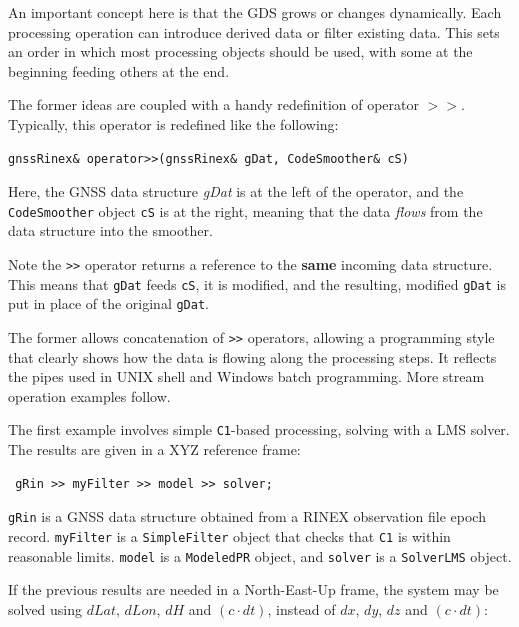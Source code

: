 \documentclass[letterpaper,ugly,10pt]{ion-gps}
\newcommand{\gpstkcommand}[1]{\texttt{\mbox{#1}}}
\newcommand{\gpstkclass}[1]{\texttt{\mbox{#1}}}
\newcommand{\rinexobservable}[1]{\texttt{#1}}
\begin{document}
An important concept here is that the GDS grows or changes dynamically. Each processing operation can introduce derived data or filter existing data. This sets an order in which most processing objects should be used, with some at the beginning feeding others at the end.

The former ideas are coupled with a handy redefinition of operator $>>$. Typically, this operator is redefined like the following:

\begin{scriptsize}
\begin{lstlisting}
gnssRinex& operator>>(gnssRinex& gDat, CodeSmoother& cS)
\end{lstlisting}
\end{scriptsize}

Here, the GNSS data structure {\it gDat} is at the left of the operator, and the \gpstkclass{CodeSmoother} object \gpstkclass{cS} is at the right, meaning that the data {\it flows} from the data structure into the smoother.

Note the \gpstkcommand{>>} operator returns a reference to the {\bf same} incoming data structure. This means that \gpstkclass{gDat} feeds \gpstkclass{cS}, it is modified, and the resulting, modified \gpstkclass{gDat} is put in place of the original \gpstkclass{gDat}.

The former allows concatenation of \gpstkcommand{>>} operators, allowing a programming style that clearly shows how the data is flowing along the processing steps. It reflects the pipes used in UNIX shell and Windows batch programming. More stream operation examples follow.

The first example involves simple \rinexobservable{C1}-based processing, solving with a LMS solver. The results are given in a XYZ reference frame:

\begin{scriptsize}
\begin{lstlisting}
 gRin >> myFilter >> model >> solver;
\end{lstlisting}
\end{scriptsize}

\gpstkclass{gRin} is a GNSS data structure obtained from a RINEX observation file epoch record. \gpstkclass{myFilter} is a \gpstkclass{SimpleFilter} object that checks that \rinexobservable{C1} is within reasonable limits. \gpstkclass{model} is a \gpstkclass{ModeledPR} object, and 
\gpstkclass{solver} is a \gpstkclass{SolverLMS} object.

If the previous results are needed in a North-East-Up frame, the system may be solved using $dLat$, $dLon$, $dH$ and $(c \cdot dt)$, instead of $dx$, $dy$, $dz$ and $(c \cdot dt)$:
\end{document}
